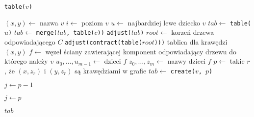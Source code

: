 \begin{algorithm}[H]
    \caption{\texttt{table($v$)}}
    \SetAlgoLined
    $(x, y) \gets$ nazwa $v$\;
    $i \gets$ poziom $v$\;
     {
        $u \gets$ najbardziej lewe dziecko $v$\;
        $tab \gets$ \texttt{table($u$)}\;
         {
            $tab \gets$ \texttt{merge($tab$, table($c$))}\;
        }
        \Return \texttt{adjust($tab$)}\;
    }
     {
        $root \gets$ korzeń drzewa odpowiadającego $C$\;
        \Return \texttt{adjust(contract(table($root$)))}\;
    }
     {
        \Return tablica dla krawędzi $(x,y)$\;
    }
    $f \gets$ węzeł ściany zawierającej komponent odpowiadający drzewu do którego należy $v$\;
    ${u_0, \dots, u_{m-1}} \gets$ dzieci $f$\;
    ${z_0, \dots, z_m} \gets$ nazwy dzieci $f$\;
    $p \gets$ takie $r$, że $(x, z_r)$ i $(y, z_r)$ są krawędziami w grafie\;
    $tab \gets$ \texttt{create($v$, $p$)}\;
    
    $j \gets p-1$\;
    
    $j \gets p$\;
    
    \Return $tab$\;
\end{algorithm}